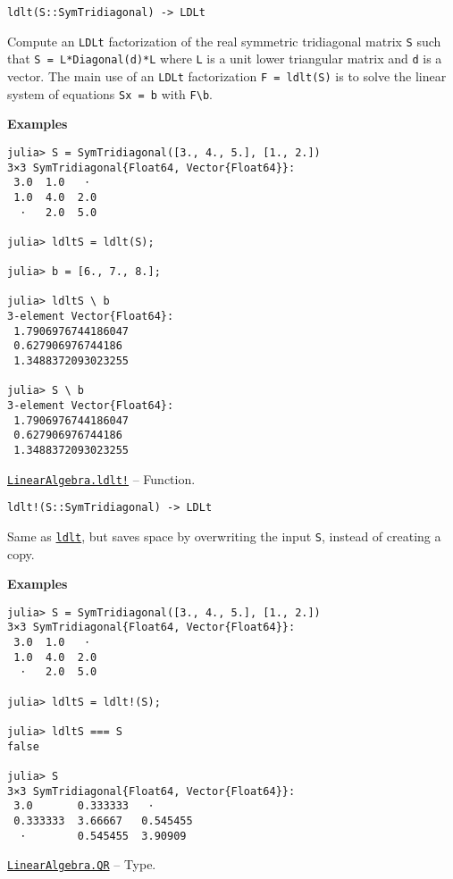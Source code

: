 \begin{adjustwidth}{2em}{0pt}


\begin{verbatim}
ldlt(S::SymTridiagonal) -> LDLt
\end{verbatim}

Compute an \texttt{LDLt} factorization of the real symmetric tridiagonal matrix \texttt{S} such that \texttt{S = L*Diagonal(d)*L{\textquotesingle}} where \texttt{L} is a unit lower triangular matrix and \texttt{d} is a vector. The main use of an \texttt{LDLt} factorization \texttt{F = ldlt(S)} is to solve the linear system of equations \texttt{Sx = b} with \texttt{F{\textbackslash}b}.

\textbf{Examples}


\begin{verbatim}
julia> S = SymTridiagonal([3., 4., 5.], [1., 2.])
3×3 SymTridiagonal{Float64, Vector{Float64}}:
 3.0  1.0   ⋅
 1.0  4.0  2.0
  ⋅   2.0  5.0

julia> ldltS = ldlt(S);

julia> b = [6., 7., 8.];

julia> ldltS \ b
3-element Vector{Float64}:
 1.7906976744186047
 0.627906976744186
 1.3488372093023255

julia> S \ b
3-element Vector{Float64}:
 1.7906976744186047
 0.627906976744186
 1.3488372093023255
\end{verbatim}



\end{adjustwidth}
\hypertarget{9183185033445403339}{}
\hyperlink{9183185033445403339}{\texttt{LinearAlgebra.ldlt!}}  -- {Function.}

\begin{adjustwidth}{2em}{0pt}


\begin{verbatim}
ldlt!(S::SymTridiagonal) -> LDLt
\end{verbatim}

Same as \hyperlink{8934377864822491393}{\texttt{ldlt}}, but saves space by overwriting the input \texttt{S}, instead of creating a copy.

\textbf{Examples}


\begin{verbatim}
julia> S = SymTridiagonal([3., 4., 5.], [1., 2.])
3×3 SymTridiagonal{Float64, Vector{Float64}}:
 3.0  1.0   ⋅
 1.0  4.0  2.0
  ⋅   2.0  5.0

julia> ldltS = ldlt!(S);

julia> ldltS === S
false

julia> S
3×3 SymTridiagonal{Float64, Vector{Float64}}:
 3.0       0.333333   ⋅
 0.333333  3.66667   0.545455
  ⋅        0.545455  3.90909
\end{verbatim}



\end{adjustwidth}
\hypertarget{16913872014958777367}{}
\hyperlink{16913872014958777367}{\texttt{LinearAlgebra.QR}}  -- {Type.}

